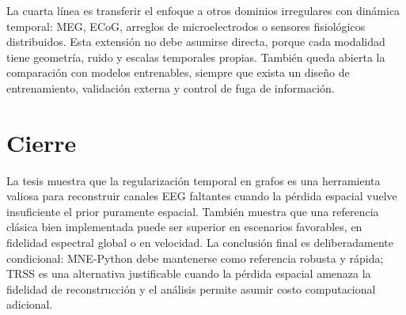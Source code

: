 La cuarta línea es transferir el enfoque a otros dominios irregulares con dinámica temporal: MEG, ECoG, arreglos de microelectrodos o sensores fisiológicos distribuidos. Esta extensión no debe asumirse directa, porque cada modalidad tiene geometría, ruido y escalas temporales propias. También queda abierta la comparación con modelos entrenables, siempre que exista un diseño de entrenamiento, validación externa y control de fuga de información.

\section{Cierre}

La tesis muestra que la regularización temporal en grafos es una herramienta valiosa para reconstruir canales EEG faltantes cuando la pérdida espacial vuelve insuficiente el prior puramente espacial. También muestra que una referencia clásica bien implementada puede ser superior en escenarios favorables, en fidelidad espectral global o en velocidad. La conclusión final es deliberadamente condicional: MNE-Python debe mantenerse como referencia robusta y rápida; TRSS es una alternativa justificable cuando la pérdida espacial amenaza la fidelidad de reconstrucción y el análisis permite asumir costo computacional adicional.
